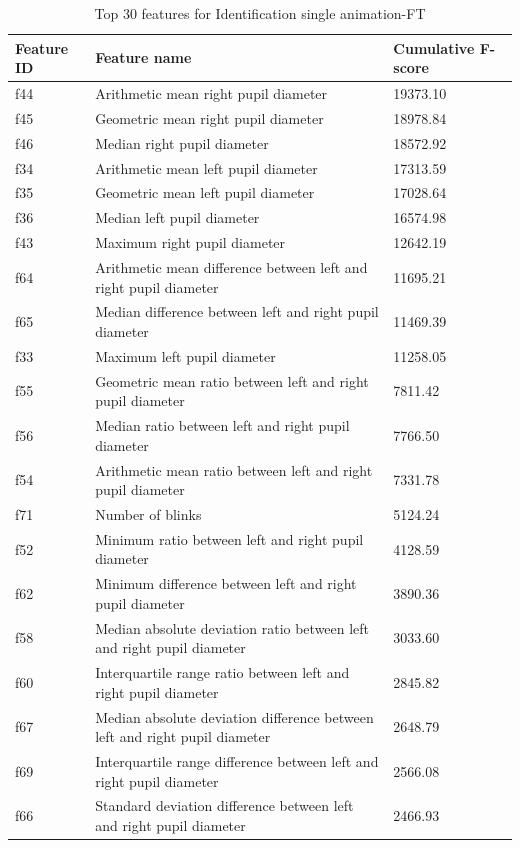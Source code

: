 \documentclass{article}
\begin{document}
\begin{table}[htbp]
\centering
\scriptsize
\setlength{\tabcolsep}{3pt}
\caption{Top 30 features for Identification single animation-FT}
\label{tab:top30_id_s_ft}
\begin{tabular}{lll}
\toprule
\textbf{Feature ID} & \textbf{Feature name} & \textbf{Cumulative F-score} \\
\midrule
f44 & Arithmetic mean right pupil diameter & 19373.10 \\
f45 & Geometric mean right pupil diameter & 18978.84 \\
f46 & Median right pupil diameter & 18572.92 \\
f34 & Arithmetic mean left pupil diameter & 17313.59 \\
f35 & Geometric mean left pupil diameter & 17028.64 \\
f36 & Median left pupil diameter & 16574.98 \\
f43 & Maximum right pupil diameter & 12642.19 \\
f64 & Arithmetic mean difference between left and right pupil diameter & 11695.21 \\
f65 & Median difference between left and right pupil diameter & 11469.39 \\
f33 & Maximum left pupil diameter & 11258.05 \\
f55 & Geometric mean ratio between left and right pupil diameter & 7811.42 \\
f56 & Median ratio between left and right pupil diameter & 7766.50 \\
f54 & Arithmetic mean ratio between left and right pupil diameter & 7331.78 \\
f71 & Number of blinks & 5124.24 \\
f52 & Minimum ratio between left and right pupil diameter & 4128.59 \\
f62 & Minimum difference between left and right pupil diameter & 3890.36 \\
f58 & Median absolute deviation ratio between left and right pupil diameter & 3033.60 \\
f60 & Interquartile range ratio between left and right pupil diameter & 2845.82 \\
f67 & Median absolute deviation difference between left and right pupil diameter & 2648.79 \\
f69 & Interquartile range difference between left and right pupil diameter & 2566.08 \\
f66 & Standard deviation difference between left and right pupil diameter & 2466.93 \\

\end{tabular}
\end{table}
\end{document}
